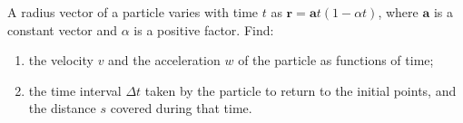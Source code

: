 
\item A radius vector of a particle varies with time $t$ as $\mathbf{r} = \mathbf{a}t (1 - \alpha t)$, where $\mathbf{a}$ is a constant vector and $\alpha$ is a positive factor.
Find:
\begin{enumerate}
    \item the velocity $v$ and the acceleration $w$ of the particle as functions of time;
    \item the time interval $\Delta t$ taken by the particle to return to the initial points, and the distance $s$ covered during that time.
\end{enumerate}
